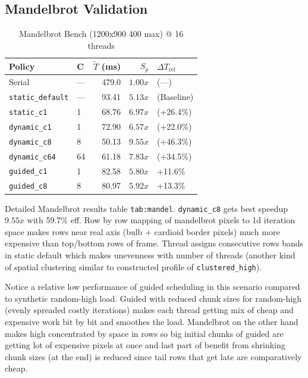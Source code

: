 \documentclass[conference]{IEEEtran}
\begin{document}
\subsection{Mandelbrot Validation}

\begin{table}[htbp]
\centering
\caption{Mandelbrot Bench (1200x900 400 max) @ 16 threads}
\label{tab:mandel}
\begin{tabular}{llrrl}
\toprule
\textbf{Policy} & \textbf{C} & $\tilde{T}$ (ms) & $S_p$ & $\Delta T_{\text{rel}}$ \\
\midrule
Serial & --- & 479.0 & $1.00x$ & (---) \\
\texttt{static\_default} & --- & 93.41 & $5.13x$ & (Baseline) \\
\texttt{static\_c1} & 1 & 68.76 & $6.97x$ & (+26.4\%) \\
\texttt{dynamic\_c1} & 1 & 72.90 & $6.57x$ & (+22.0\%) \\
\texttt{dynamic\_c8} & 8 & 50.13 & $9.55x$ & (+46.3\%) \\
\texttt{dynamic\_c64} & 64 & 61.18 & $7.83x$ & (+34.5\%) \\
\texttt{guided\_c1} & 1 & 82.58 & $5.80x$ & +11.6\% \\
\texttt{guided\_c8} & 8 & 80.97 & $5.92x$ & +13.3\% \\
\bottomrule
\end{tabular}
\end{table}

Detailed Mandelbrot results table \texttt{tab:mandel}. \texttt{dynamic\_c8} gets best speedup $9.55x$ with 59.7\% eff. Row by row mapping of mandelbrot pixels to 1d iteration space makes rows near real axis (bulb + cardioid border pixels) much more expensive than top/bottom rows of frame. Thread assigns consecutive rows bands in static default which makes unevenness with number of threads (another kind of spatial clustering similar to constructed profile of \texttt{clustered\_high}).

Notice a relative low performance of guided scheduling in this scenario compared to synthetic random-high load. Guided with reduced chunk sizes for random-high (evenly spreaded costly iterations) makes each thread getting mix of cheap and expensive work bit by bit and smoothes the load. Mandelbrot on the other hand makes high concentrated by space in rows so big initial chunks of guided are getting lot of expensive pixels at once and last part of benefit from shrinking chunk sizes (at the end) is reduced since tail rows that get late are comparatively cheap.
\end{document}
